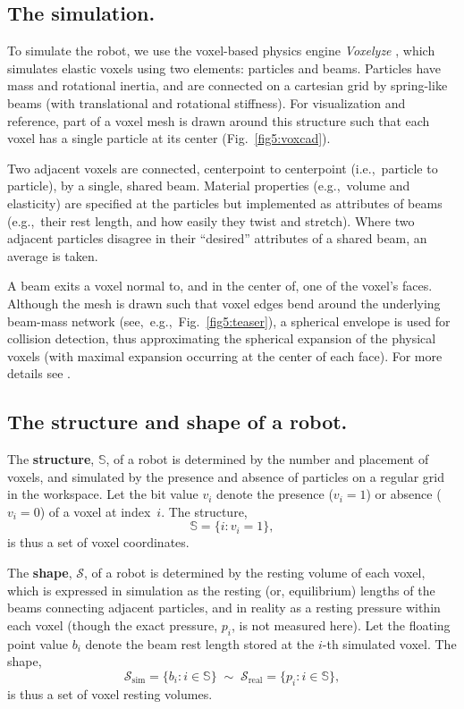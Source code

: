\subsection*{The simulation.}




To simulate the robot, we use the voxel-based physics engine \textit{Voxelyze} \cite{hiller2014dynamic},
which simulates elastic voxels using two elements: particles and beams.
Particles have mass and rotational inertia, and are connected on a cartesian grid by spring-like beams (with translational and rotational stiffness).
For visualization and reference, part of a voxel mesh is drawn around this structure such that each voxel has a single particle at its center (Fig.~\ref{fig5:voxcad}).

Two adjacent voxels are connected, centerpoint to centerpoint (i.e.,~particle to particle), by a single, shared beam.
Material properties (e.g.,~volume and elasticity) are specified at the particles but implemented as attributes of beams (e.g.,~their rest length, and how easily they twist and stretch).
Where two adjacent particles disagree in their ``desired'' attributes of a shared beam, an average is taken.

A beam exits a voxel normal to, and in the center of, one of the voxel's faces.
Although the mesh is drawn such that voxel edges bend around the underlying beam-mass network (see,~e.g.,~Fig.~\ref{fig5:teaser}), a spherical envelope is used for collision detection, thus approximating the spherical expansion of the physical voxels (with maximal expansion occurring at the center of each face).
For more details see \cite{hiller2014dynamic}.


\subsection*{The structure and shape of a robot.}

The \textbf{structure}, $\mathbb{S}$,
of a robot is determined by the number and placement of voxels, and simulated by the presence and absence of particles on a regular grid in the workspace.
Let the bit value $v_i$ denote the presence ($v_i=1$) or absence ($v_i=0$) of a voxel at index~$i$.
The structure,
\begin{equation}
    \label{eq5:structure}
    \mathbb{S} = \{i : v_i = 1 \} ,
\end{equation}
is thus a set of voxel coordinates.

The \textbf{shape}, $\mathcal{S}$,
of a robot is determined by the resting volume of each voxel, which is expressed in simulation as the resting (or, equilibrium) lengths of the beams connecting adjacent particles, and in reality as a resting pressure within each voxel (though the exact pressure, $p_i$, is not measured here).
Let the floating point value $b_i$ denote the beam rest length stored at the $i$-th simulated voxel.
The shape,
\begin{equation}
    \label{eq5:shape}
    \mathcal{S}_{\text{sim}} = \{b_i : i \in \mathbb{S} \} \; \sim \; \mathcal{S}_{\text{real}} = \{p_i : i \in \mathbb{S} \} ,
\end{equation}
is thus a set of voxel resting volumes.


